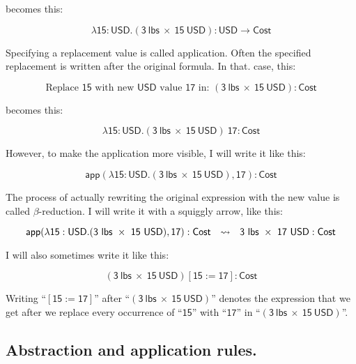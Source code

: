 \documentclass{article}
\newcommand\term{\mathsf}
\def\abstrBinder/{\lambda}
\def\appFunc/{\mathsf{app}}
\newcommand\abstr[3]{\term{\abstrBinder/ #1 : #2.#3}}
\newcommand\app[2]{\term{\appFunc/(#1, #2)}}
\begin{document}
becomes this:

\begin{equation*}
  \abstr{15}{USD}{(3~lbs~\times~15~USD): USD \rightarrow Cost}
\end{equation*}

Specifying a replacement value is called application. Often the specified replacement is written after the original formula. In that. case, this:

\begin{equation*}
  \text{Replace $\term{15}$ with new $\term{USD}$ value $\term{17}$ in: } \term{(3~lbs~\times~15~USD):Cost}
\end{equation*}

becomes this:

\begin{equation*}
  \abstr{15}{USD}{(3~lbs~\times~15~USD)}~\term{17} : \term{Cost}
\end{equation*}

However, to make the application more visible, I will write it like this:

\begin{equation*}
  \app{\abstr{15}{USD}{(3~lbs~\times~15~USD)}}{17} : \term{Cost}
\end{equation*}

The process of actually rewriting the original expression with the new value is called $\beta$-reduction. I will write it with a squiggly arrow, like this:

\begin{equation*}
  \app{\abstr{15}{USD}{(3~lbs~\times~15~USD)}}{17} : \term{Cost} \hskip 0.25cm \rightsquigarrow \hskip 0.25cm \term{3~lbs~\times~17~USD} : \term{Cost}
\end{equation*}

I will also sometimes write it like this:

\begin{equation*}
  \term{(3~lbs~\times~15~USD)[15 := 17]} : \term{Cost}
\end{equation*}

Writing ``$\term{[15 := 17]}$'' after ``$\term{(3~lbs~\times~15~USD)}$'' denotes the expression that we get after we replace every occurrence of ``$\term{15}$'' with ``$\term{17}$'' in ``$\term{(3~lbs~\times~15~USD)}$''.


\subsection{Abstraction and application rules.}
\end{document}
